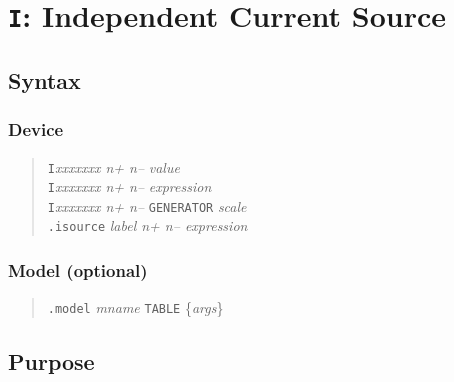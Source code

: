 %
%
%
%
\section{{\tt I}: Independent Current Source}
\subsection{Syntax}
\subsubsection{Device}
\begin{verse}
{\tt I}{\it xxxxxxx n+ n--} {\it value}\\
{\tt I}{\it xxxxxxx n+ n--} {\it expression}\\
{\tt I}{\it xxxxxxx n+ n--} {\tt GENERATOR} {\it scale}\\
{\tt .isource} {\it label n+ n-- expression}
\end{verse}
\subsubsection{Model (optional)}
\begin{verse}
{\tt .model} {\it mname} {\tt TABLE} \{{\it args}\}
\end{verse}
\subsection{Purpose}

